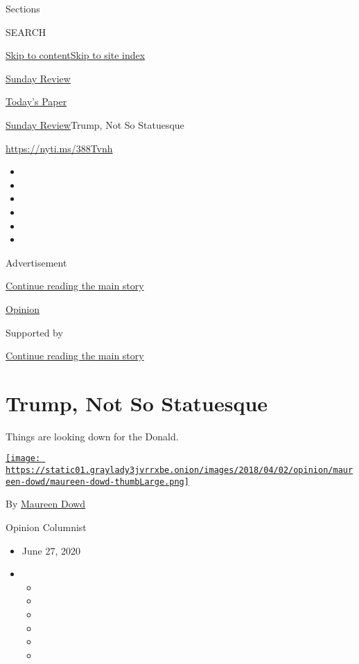 Sections

SEARCH

\protect\hyperlink{site-content}{Skip to
content}\protect\hyperlink{site-index}{Skip to site index}

\href{https://www.nytimes3xbfgragh.onion/section/opinion/sunday}{Sunday
Review}

\href{https://myaccount.nytimes3xbfgragh.onion/auth/login?response_type=cookie\&client_id=vi}{}

\href{https://www.nytimes3xbfgragh.onion/section/todayspaper}{Today's
Paper}

\href{/section/opinion/sunday}{Sunday Review}\textbar{}Trump, Not So
Statuesque

\url{https://nyti.ms/388Tvnh}

\begin{itemize}
\item
\item
\item
\item
\item
\item
\end{itemize}

Advertisement

\protect\hyperlink{after-top}{Continue reading the main story}

\href{/section/opinion}{Opinion}

Supported by

\protect\hyperlink{after-sponsor}{Continue reading the main story}

\hypertarget{trump-not-so-statuesque}{%
\section{Trump, Not So Statuesque}\label{trump-not-so-statuesque}}

Things are looking down for the Donald.

\href{https://www.nytimes3xbfgragh.onion/by/maureen-dowd}{\texttt{[image: https://static01.graylady3jvrrxbe.onion/images/2018/04/02/opinion/maureen-dowd/maureen-dowd-thumbLarge.png]}}

By \href{https://www.nytimes3xbfgragh.onion/by/maureen-dowd}{Maureen
Dowd}

Opinion Columnist

\begin{itemize}
\item
  June 27, 2020
\item
  \begin{itemize}
  \item
  \item
  \item
  \item
  \item
  \item
  \end{itemize}
\end{itemize}

